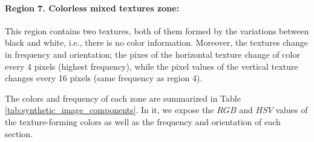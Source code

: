 \paragraph{Region 7. Colorless mixed textures zone:}
This region contains two textures, both of them formed by the variations between black and white, i.e., there is no color information. Moreover, the textures change in frequency and orientation; the pixes of the horizontal texture change of color every 4 pixels (highest frequency), while the pixel values of the vertical texture changes every 16 pixels (same frequency as region 4).

The colors and frequency of each zone are summarized in Table \ref{tab:synthetic_image_components}. In it, we expose the $RGB$ and $HSV$ values of the texture-forming colors as well as the frequency and orientation of each section.


